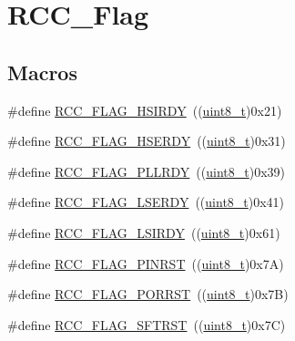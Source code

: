 \hypertarget{group___r_c_c___flag}{}\section{R\+C\+C\+\_\+\+Flag}
\label{group___r_c_c___flag}
\subsection*{Macros}
\begin{DoxyCompactItemize}
\item 
\#define \hyperlink{group___r_c_c___flag_ga827d986723e7ce652fa733bb8184d216}{R\+C\+C\+\_\+\+F\+L\+A\+G\+\_\+\+H\+S\+I\+R\+DY}~((\hyperlink{_p_e___types_8h_aba7bc1797add20fe3efdf37ced1182c5}{uint8\+\_\+t})0x21)
\item 
\#define \hyperlink{group___r_c_c___flag_ga173edf47bec93cf269a0e8d0fec9997c}{R\+C\+C\+\_\+\+F\+L\+A\+G\+\_\+\+H\+S\+E\+R\+DY}~((\hyperlink{_p_e___types_8h_aba7bc1797add20fe3efdf37ced1182c5}{uint8\+\_\+t})0x31)
\item 
\#define \hyperlink{group___r_c_c___flag_gaf82d8afb18d9df75db1d6c08b9c50046}{R\+C\+C\+\_\+\+F\+L\+A\+G\+\_\+\+P\+L\+L\+R\+DY}~((\hyperlink{_p_e___types_8h_aba7bc1797add20fe3efdf37ced1182c5}{uint8\+\_\+t})0x39)
\item 
\#define \hyperlink{group___r_c_c___flag_gac9fb963db446c16e46a18908f7fe1927}{R\+C\+C\+\_\+\+F\+L\+A\+G\+\_\+\+L\+S\+E\+R\+DY}~((\hyperlink{_p_e___types_8h_aba7bc1797add20fe3efdf37ced1182c5}{uint8\+\_\+t})0x41)
\item 
\#define \hyperlink{group___r_c_c___flag_ga8c5e4992314d347597621bfe7ab10d72}{R\+C\+C\+\_\+\+F\+L\+A\+G\+\_\+\+L\+S\+I\+R\+DY}~((\hyperlink{_p_e___types_8h_aba7bc1797add20fe3efdf37ced1182c5}{uint8\+\_\+t})0x61)
\item 
\#define \hyperlink{group___r_c_c___flag_gabfc3ab5d4a8a94ec1c9f38794ce37ad6}{R\+C\+C\+\_\+\+F\+L\+A\+G\+\_\+\+P\+I\+N\+R\+ST}~((\hyperlink{_p_e___types_8h_aba7bc1797add20fe3efdf37ced1182c5}{uint8\+\_\+t})0x7\+A)
\item 
\#define \hyperlink{group___r_c_c___flag_ga39ad309070f416720207eece5da7dc2c}{R\+C\+C\+\_\+\+F\+L\+A\+G\+\_\+\+P\+O\+R\+R\+ST}~((\hyperlink{_p_e___types_8h_aba7bc1797add20fe3efdf37ced1182c5}{uint8\+\_\+t})0x7\+B)
\item 
\#define \hyperlink{group___r_c_c___flag_gaf7852615e9b19f0b2dbc8d08c7594b52}{R\+C\+C\+\_\+\+F\+L\+A\+G\+\_\+\+S\+F\+T\+R\+ST}~((\hyperlink{_p_e___types_8h_aba7bc1797add20fe3efdf37ced1182c5}{uint8\+\_\+t})0x7\+C)

\end{DoxyCompactItemize}
